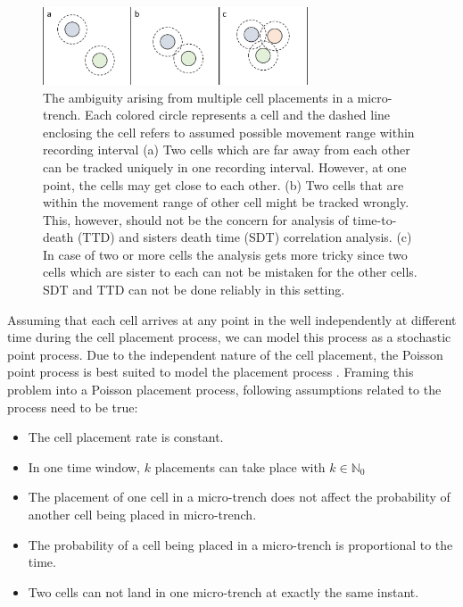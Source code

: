 \documentclass[pdftex,12pt,a4paper]{report}
\begin{document}
\begin{figure}[H]
\centering
\includegraphics[width=0.7\textwidth]{images/cells_confusion.pdf}
\caption[Illustration of SVM in 2D]{The ambiguity arising from multiple cell placements in a micro-trench.  Each colored circle represents a cell and the dashed line enclosing the cell refers to assumed possible movement range within recording interval (a) Two cells which are far away from each other can be tracked uniquely in one recording interval. However, at one point, the cells may get close to each other. (b) Two cells that are within the movement range of other cell might be tracked wrongly. This, however, should not be the concern for analysis of time-to-death (TTD)  and sisters death time (SDT) correlation analysis. (c) In case of two or more cells the analysis gets more tricky  since two cells which are sister to each can not be mistaken for the other cells. SDT and TTD can not be done reliably in this setting.}
\label{fig:cell_placements}
\end{figure}

Assuming that each cell arrives at any point in the well independently at different time during the cell placement process, we can model this process as a stochastic point process.  Due to the independent nature of the cell placement, the Poisson point process is best suited to model the placement process \cite{miles1970homogeneous}. Framing this problem into a Poisson placement process, following assumptions related to the process need to be true:

\begin{itemize}
\item The cell placement rate is constant.
\item In one time window, $k$ placements can take place with $k \in \mathbb{N}_0$
\item The placement of one cell in a micro-trench does not affect the probability of another cell being placed in micro-trench.
\item The probability of a cell being placed in a micro-trench is proportional to the time.
\item Two cells can not land in one micro-trench at exactly the same instant.
\end{itemize}
\end{document}
